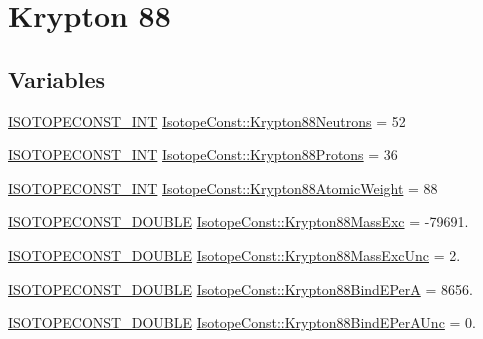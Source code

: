 \hypertarget{group___isotope_const-_krypton-_kr88}{}\section{Krypton 88}
\label{group___isotope_const-_krypton-_kr88}
\subsection*{Variables}
\begin{DoxyCompactItemize}
\item 
\mbox{\hyperlink{group___isotope_const-_macros_ga5f18360b3e99483a35c32d789e62621c}{I\+S\+O\+T\+O\+P\+E\+C\+O\+N\+S\+T\+\_\+\+I\+NT}} \mbox{\hyperlink{group___isotope_const-_krypton-_kr88_ga18989ed49716f78db61e0430ea20c1b8}{Isotope\+Const\+::\+Krypton88\+Neutrons}} = 52
\item 
\mbox{\hyperlink{group___isotope_const-_macros_ga5f18360b3e99483a35c32d789e62621c}{I\+S\+O\+T\+O\+P\+E\+C\+O\+N\+S\+T\+\_\+\+I\+NT}} \mbox{\hyperlink{group___isotope_const-_krypton-_kr88_ga5f0c909a7998509cae0dba65222a801e}{Isotope\+Const\+::\+Krypton88\+Protons}} = 36
\item 
\mbox{\hyperlink{group___isotope_const-_macros_ga5f18360b3e99483a35c32d789e62621c}{I\+S\+O\+T\+O\+P\+E\+C\+O\+N\+S\+T\+\_\+\+I\+NT}} \mbox{\hyperlink{group___isotope_const-_krypton-_kr88_ga9b362cde3c2db509a79770d1d6788e5c}{Isotope\+Const\+::\+Krypton88\+Atomic\+Weight}} = 88
\item 
\mbox{\hyperlink{group___isotope_const-_macros_ga8f45a7272ce02c0b4c65c44636ed719a}{I\+S\+O\+T\+O\+P\+E\+C\+O\+N\+S\+T\+\_\+\+D\+O\+U\+B\+LE}} \mbox{\hyperlink{group___isotope_const-_krypton-_kr88_gaa7e9679b5c886d955bd1f85b2ab74600}{Isotope\+Const\+::\+Krypton88\+Mass\+Exc}} = -\/79691.
\item 
\mbox{\hyperlink{group___isotope_const-_macros_ga8f45a7272ce02c0b4c65c44636ed719a}{I\+S\+O\+T\+O\+P\+E\+C\+O\+N\+S\+T\+\_\+\+D\+O\+U\+B\+LE}} \mbox{\hyperlink{group___isotope_const-_krypton-_kr88_ga1973768382bd4b849803d8715ce46145}{Isotope\+Const\+::\+Krypton88\+Mass\+Exc\+Unc}} = 2.
\item 
\mbox{\hyperlink{group___isotope_const-_macros_ga8f45a7272ce02c0b4c65c44636ed719a}{I\+S\+O\+T\+O\+P\+E\+C\+O\+N\+S\+T\+\_\+\+D\+O\+U\+B\+LE}} \mbox{\hyperlink{group___isotope_const-_krypton-_kr88_ga3803bdabf7ad2c5a1e7f3c3af3226f01}{Isotope\+Const\+::\+Krypton88\+Bind\+E\+PerA}} = 8656.
\item 
\mbox{\hyperlink{group___isotope_const-_macros_ga8f45a7272ce02c0b4c65c44636ed719a}{I\+S\+O\+T\+O\+P\+E\+C\+O\+N\+S\+T\+\_\+\+D\+O\+U\+B\+LE}} \mbox{\hyperlink{group___isotope_const-_krypton-_kr88_ga1bfb9a761c2e32b8c0bd72639a4b30a3}{Isotope\+Const\+::\+Krypton88\+Bind\+E\+Per\+A\+Unc}} = 0.

\end{DoxyCompactItemize}

